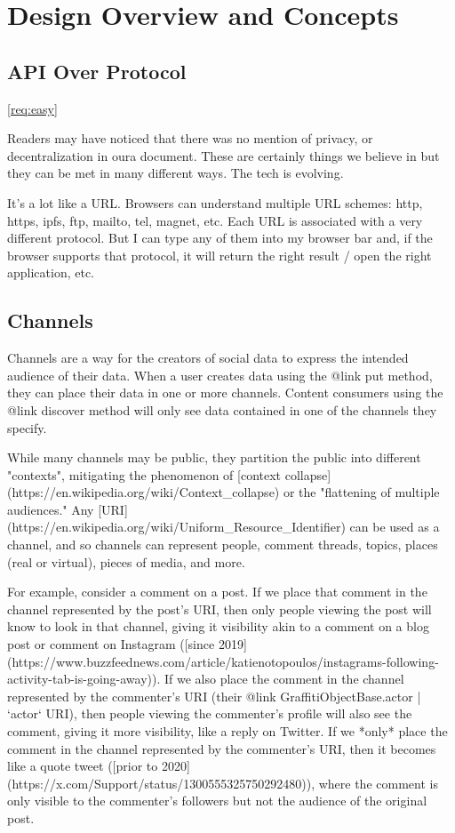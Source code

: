 \usepackage{xr-hyper}

\section{Design Overview and Concepts}


\subsection{API Over Protocol}

\ref{req:easy}

Readers may have noticed that there was no mention of privacy,
or decentralization in oura document.
These are certainly things we believe in but they can be met in many different ways.
The tech is evolving.

It's a lot like a URL. Browsers can understand multiple URL schemes: http, https, ipfs, ftp, mailto, tel, magnet, etc. Each URL is associated with a very different protocol. But I can type any of them into my browser bar and, if the browser supports that protocol, it will return the right result / open the right application, etc.

\subsection{Channels}

Channels are a way for the creators of social data to express the intended audience of their
data. When a user creates data using the {@link put} method, they
can place their data in one or more channels.
Content consumers using the {@link discover} method will only see data
contained in one of the channels they specify.

While many channels may be public, they partition
the public into different "contexts", mitigating the
phenomenon of [context collapse](https://en.wikipedia.org/wiki/Context_collapse) or the "flattening of multiple audiences."
Any [URI](https://en.wikipedia.org/wiki/Uniform_Resource_Identifier) can be used as a channel, and so channels can represent people,
comment threads, topics, places (real or virtual), pieces of media, and more.

For example, consider a comment on a post. If we place that comment in the channel
represented by the post's URI, then only people viewing the post will know to
look in that channel, giving it visibility akin to a comment on a blog post
or comment on Instagram ([since 2019](https://www.buzzfeednews.com/article/katienotopoulos/instagrams-following-activity-tab-is-going-away)).
If we also place the comment in the channel represented by the commenter's URI (their
{@link GraffitiObjectBase.actor | `actor` URI}), then people viewing the commenter's profile
will also see the comment, giving it more visibility, like a reply on Twitter.
If we *only* place the comment in the channel represented by the commenter's URI, then
it becomes like a quote tweet ([prior to 2020](https://x.com/Support/status/1300555325750292480)),
where the comment is only visible to the commenter's followers but not the audience
of the original post.

